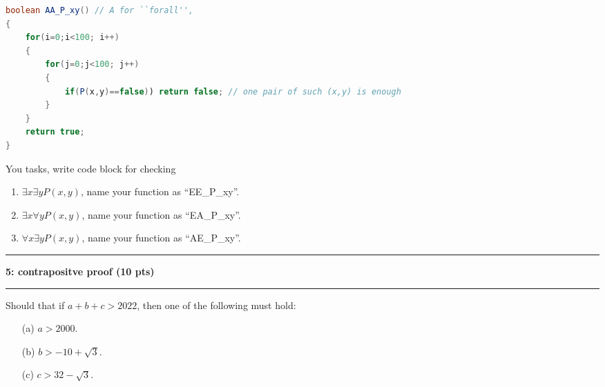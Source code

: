 \documentclass[11pt]{article}
\newcommand\question[2]{\vspace{.25in}\hrule\textbf{#1: #2}\vspace{.5em}\hrule\vspace{.10in}}
\begin{document}
\begin{lstlisting}[language=Java, caption=Java example]
boolean AA_P_xy() // A for ``forall'',
{
    for(i=0;i<100; i++)
    {
        for(j=0;j<100; j++)
        {
            if(P(x,y)==false)) return false; // one pair of such (x,y) is enough
        }
    }
    return true;
}
\end{lstlisting}
You tasks, write code block for checking
\begin{enumerate}
    \item $\exists x \exists y P(x,y)$, name your function as ``EE\_P\_xy''.

    \item $\exists x \forall y P(x,y)$, name your function as ``EA\_P\_xy''.

    \item $\forall x \exists y P(x,y)$, name your function as ``AE\_P\_xy''.
\end{enumerate}



\question{5}{contrapositve proof (10 pts)}
Should that if $a + b + c >  2022$, then one of the following must hold:
\begin{enumerate}
     \item[(a)] $a > 2000$.
     \item[(b)] $b> -10 + \sqrt{3}$.
     \item[(c)] $ c> 32 -\sqrt{3}$.
 \end{enumerate}
\end{document}
